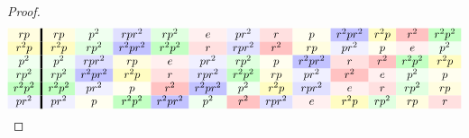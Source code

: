 \documentclass{ximera}
\begin{document}
\begin{example}
\begin{proof}
\begin{gather*}
\begin{array}{c!{\vline width 2pt}cccccccccccc}
      r p \cellcolor{yellow!12!white}   & rp \cellcolor{yellow!12!white}   & p^2 \cellcolor{green!6!white}   & rpr^2 \cellcolor{blue!12!white}    & rp^2\cellcolor{green!12!white}   & e\cellcolor{red!6!white}     & pr^2\cellcolor{blue!6!white}  & r\cellcolor{red!12!white}  &  p \cellcolor{yellow!6!white}  & r^2pr^2\cellcolor{blue!24!white} & r^2p \cellcolor{yellow!24!white}  &  r^2 \cellcolor{red!24!white}  & r^2p^2 \cellcolor{green!24!white}  \\  
      r^2 p\cellcolor{yellow!24!white}  & r^2 p\cellcolor{yellow!24!white} & rp^2 \cellcolor{green!12!white}    & r^2 pr^2\cellcolor{blue!24!white}   & r^2p^2\cellcolor{green!24!white}    & r\cellcolor{red!12!white}   & rpr^2\cellcolor{blue!12!white} & r^2\cellcolor{red!24!white} &  rp \cellcolor{yellow!12!white}  &  pr^2 \cellcolor{blue!6!white}  & p \cellcolor{yellow!6!white}  &  e \cellcolor{red!6!white}  & p^2 \cellcolor{green!6!white}    \\
      p^2\cellcolor{green!6!white}      & p^2\cellcolor{green!6!white} & rpr^2 \cellcolor{blue!12!white} & rp \cellcolor{yellow!12!white} & e\cellcolor{red!6!white} &  pr^2 \cellcolor{blue!6!white}  &  rp^2 \cellcolor{green!12!white} &  p \cellcolor{yellow!6!white}  & r^2pr^2 \cellcolor{blue!24!white}  & r \cellcolor{red!12!white}   & r^2\cellcolor{red!24!white} &  r^2p^2 \cellcolor{green!24!white}  & r^2p \cellcolor{yellow!24!white}\\
      rp^2\cellcolor{green!12!white}    & rp^2\cellcolor{green!12!white} & r^2pr^2\cellcolor{blue!24!white} & r^2p \cellcolor{yellow!24!white} & r\cellcolor{red!12!white}& rpr^2 \cellcolor{blue!12!white}  & r^2p^2 \cellcolor{green!24!white} &  rp \cellcolor{yellow!12!white}  & pr^2 \cellcolor{blue!6!white}  & r^2 \cellcolor{red!24!white}   & e\cellcolor{red!6!white} &  p^2 \cellcolor{green!6!white}  & p \cellcolor{yellow!6!white}\\
      r^2p^2\cellcolor{green!24!white}  & r^2p^2\cellcolor{green!24!white}& pr^2 \cellcolor{blue!6!white} & p\cellcolor{yellow!6!white} & r^2\cellcolor{red!24!white}&  r^2pr^2 \cellcolor{blue!24!white}  &  p^2 \cellcolor{green!6!white} &  r^2p \cellcolor{yellow!24!white}  & rpr^2 \cellcolor{blue!12!white}  & e \cellcolor{red!6!white}   & r\cellcolor{red!12!white} &  rp^2 \cellcolor{green!12!white}  & rp \cellcolor{yellow!12!white}\\
      pr^2\cellcolor{blue!6!white}      & pr^2\cellcolor{blue!6!white} & p\cellcolor{yellow!6!white} & r^2p^2 \cellcolor{green!24!white} & r^2pr^2\cellcolor{blue!24!white}& p^2\cellcolor{green!6!white}& r^2\cellcolor{red!24!white} & rpr^2\cellcolor{blue!12!white} & e\cellcolor{red!6!white}  &  r^2p \cellcolor{yellow!24!white}  & rp^2 \cellcolor{green!12!white}  & rp \cellcolor{yellow!12!white}  & r \cellcolor{red!12!white}\\

\end{array}
\end{gather*}
\end{proof}
\end{example}
\end{document}
